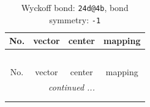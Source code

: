 \documentclass[fleqn,8pt]{jsarticle}
\begin{document}
\renewcommand{\arraystretch}{1.2}
\begin{longtable}{cccc}
\caption{Wyckoff bond: {\tt 24d@4b}, bond symmetry: {\tt -1}}
 \\
 \hline \hline
No. & vector & center & mapping \\ \hline \endfirsthead

\multicolumn{3}{l}{\tablename\ \thetable{}} \\
 \hline \hline
No. & vector & center & mapping \\ \hline \endhead

 \hline \hline
\multicolumn{3}{r}{\footnotesize\it continued ...} \\ \endfoot

 \hline \hline
\multicolumn{3}{r}{} \\ \endlastfoot


\end{longtable}
\end{document}
